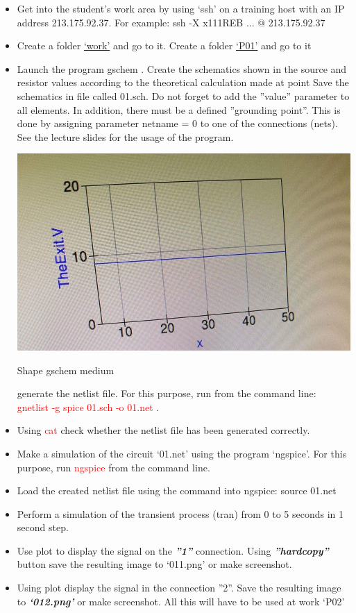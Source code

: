 \documentclass{report}
\begin{document}
\begin{itemize}
  \item Get into the student’s work area by using ‘ssh’ on a training host with an IP address
213.175.92.37. For example: ssh -X x111REB ... @ 213.175.92.37
  \item Create a folder \underline{‘work’} and go to it. Create a folder \underline{‘P01’} and go to it
  
  \item Launch the program gschem . Create the schematics shown in the 
source and resistor values according to the theoretical calculation made at point 
Save the schematics in file called 01.sch. Do not forget to add the ”value” parameter
to all elements. In addition, there must be a defined ”grounding point”. This is done by
assigning parameter netname = 0 to one of the connections (nets). See the lecture slides
for the usage of the program. \cite{firstRef, fourthRef}


\includegraphics{Figures/figure_1_.jpg}
\caption{Shape gschem medium}
\label{fig:figure1}



generate the netlist file. For this purpose, run from the command line: \textcolor{red}{gnetlist -g spice 01.sch -o 01.net }.
\item Using \textcolor{red}{cat} check whether the netlist file has been generated correctly.
\item Make a simulation of the circuit ‘01.net’ using the program ‘ngspice’. For this purpose,
run \textcolor{red}{ngspice} from the command line.
\item Load the created netlist file using the command into ngspice: source 01.net
\item Perform a simulation of the transient process (tran) from 0 to 5 seconds in 1 second step.
\item Use plot to display the signal on the \textbf{\textit{”1”}} connection. Using \textbf{\textit{”hardcopy”}} button save
the resulting image to ‘011.png’ or make screenshot.
\item Using plot display the signal in the connection ”2”. Save the resulting image to \textbf{\textit{‘012.png’}}
or make screenshot. All this will have to be used at work ‘P02’
\end{itemize}
\end{document}
